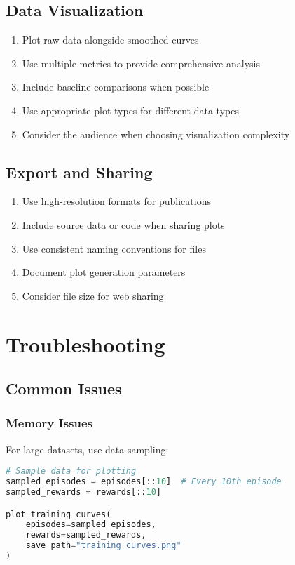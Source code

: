 \subsection{Data Visualization}

\begin{enumerate}
    \item Plot raw data alongside smoothed curves
    \item Use multiple metrics to provide comprehensive analysis
    \item Include baseline comparisons when possible
    \item Use appropriate plot types for different data types
    \item Consider the audience when choosing visualization complexity
\end{enumerate}

\subsection{Export and Sharing}

\begin{enumerate}
    \item Use high-resolution formats for publications
    \item Include source data or code when sharing plots
    \item Use consistent naming conventions for files
    \item Document plot generation parameters
    \item Consider file size for web sharing
\end{enumerate}

\section{Troubleshooting}

\subsection{Common Issues}

\subsubsection{Memory Issues}

For large datasets, use data sampling:

\begin{lstlisting}[language=python, caption=Memory Management]
# Sample data for plotting
sampled_episodes = episodes[::10]  # Every 10th episode
sampled_rewards = rewards[::10]

plot_training_curves(
    episodes=sampled_episodes,
    rewards=sampled_rewards,
    save_path="training_curves.png"
)
\end{lstlisting}

